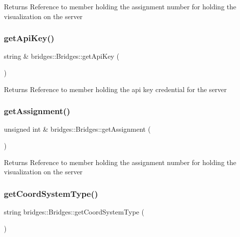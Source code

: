 \begin{DoxyReturn}{Returns}
Reference to member holding the assignment number for holding the visualization on the server 
\end{DoxyReturn}
\mbox{\label{namespacebridges_1_1_bridges_a4d1e3aef813d45b6f2aaabc41b27f828}} 
\subsubsection{\texorpdfstring{get\+Api\+Key()}{getApiKey()}}
{\footnotesize\ttfamily string \& bridges\+::\+Bridges\+::get\+Api\+Key (\begin{DoxyParamCaption}{ }\end{DoxyParamCaption})}

\begin{DoxyReturn}{Returns}
Reference to member holding the api key credential for the server 
\end{DoxyReturn}
\mbox{\label{namespacebridges_1_1_bridges_a0b8fd357e79b97af1b3c178d3eefd774}} 
\subsubsection{\texorpdfstring{get\+Assignment()}{getAssignment()}}
{\footnotesize\ttfamily unsigned int \& bridges\+::\+Bridges\+::get\+Assignment (\begin{DoxyParamCaption}{ }\end{DoxyParamCaption})}

\begin{DoxyReturn}{Returns}
Reference to member holding the assignment number for holding the visualization on the server 
\end{DoxyReturn}
\mbox{\label{namespacebridges_1_1_bridges_a31f5db39ab9ce7df3e635eaaad1feb12}} 
\subsubsection{\texorpdfstring{get\+Coord\+System\+Type()}{getCoordSystemType()}}
{\footnotesize\ttfamily string bridges\+::\+Bridges\+::get\+Coord\+System\+Type (\begin{DoxyParamCaption}{ }\end{DoxyParamCaption})}

